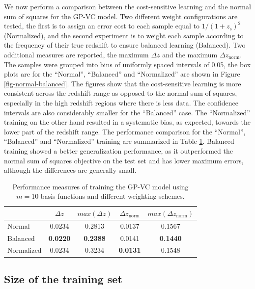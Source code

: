 \documentclass[useAMS,usenatbib,fleqn]{mn2e}
\begin{document}
We now perform a comparison between the cost-sensitive learning and the normal sum of squares for the GP-VC model. Two different weight configurations are tested, the first is to assign an error cost to each sample equal to $1/\left(1+z_\textrm{s}\right)^{2}$ (Normalized), and the second experiment is to weight each sample according to the frequency of their true redshift to ensure balanced learning (Balanced).  Two additional measures are reported, the maximum $\Delta z$ and the maximum $\Delta z_\textrm{norm}$. The samples were grouped into bins of uniformly spaced intervals of 0.05, the box plots are for the ``Normal'', ``Balanced'' and ``Normalized'' are shown in Figure \ref{fig-normal-balanced}. The figures show that the cost-sensitive learning is more consistent across the redshift range as opposed to the normal sum of squares, especially in the high redshift regions where there is less data. The confidence intervals are also considerably smaller for the ``Balanced'' case. The ``Normalized'' training on the other hand resulted in a systematic bias, as expected, towards the lower part of the redshift range. The performance comparison for the ``Normal'', ``Balanced'' and ``Normalized'' training are summarized in Table \ref{table-normal-balanced}. Balanced training showed a better generalization performance, as it outperformed the normal sum of squares objective on the test set and has lower maximum errors, although the differences are generally small.

 \begin{table}
\caption{Performance measures of training the GP-VC model using $m=10$ basis functions and different weighting schemes.}
\begin{center}
  \begin{tabular}{| l | c | c | c | c |}
     				&	$\Delta z$		&	$max\left(\Delta z\right)$		&	$\Delta z_\textrm{norm}$		&	$max\left(\Delta z_\textrm{norm}\right)$	\\	\hline
	Normal			&	0.0234			&	0.2813							&	0.0137							&	0.1567				\\
	Balanced		&	\textbf{0.0220}	&	\textbf{0.2388}					&	0.0141							&	\textbf{0.1440}			\\
	Normalized		&	0.0234			&	0.3234							&	\textbf{0.0131}					&	0.1548				\\	\hline
  \end{tabular}
\end{center}
\label{table-normal-balanced}
\end{table}

\subsection{Size of the training set}
\label{sec-sizetraining}
\end{document}
